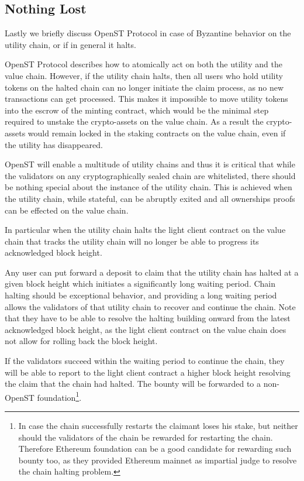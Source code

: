 \documentclass[12pt,a4paper, twocolumn]{article}
\begin{document}
\subsection{Nothing Lost}
Lastly we briefly discuss OpenST Protocol in case of Byzantine behavior on the utility chain, or if in general it halts. \par
OpenST Protocol describes how to atomically act on both the utility and the value chain.  However, if the utility chain halts, then all users who hold utility tokens on the halted chain can no longer initiate the claim process, as no new transactions can get processed.  This makes it impossible to move utility tokens into the escrow of the minting contract, which would be the minimal step required to unstake the crypto-assets on the value chain.  As a result the crypto-assets would remain locked in the staking contracts on the value chain, even if the utility has disappeared. \par 
OpenST will enable a multitude of utility chains and thus it is critical that while the validators on any cryptographically sealed chain are whitelisted, there should be nothing special about the instance of the utility chain.  This is achieved when the utility chain, while stateful, can be abruptly exited and all ownerships proofs can be effected on the value chain. \par In particular when the utility chain halts the light client contract on the value chain that tracks the utility chain will no longer be able to progress its acknowledged block height.\par
Any user can put forward a deposit to claim that the utility chain has halted at a given block height which initiates a significantly long waiting period.  Chain halting should be exceptional behavior, and providing a long waiting period allows the validators of that utility chain to recover and continue the chain.  Note that they have to be able to resolve the halting building onward from the latest acknowledged block height, as the light client contract on the value chain does not allow for rolling back the block height. \par
If the validators succeed within the waiting period to continue the chain, they will be able to report to the light client contract a higher block height resolving the claim that the chain had halted.  The bounty will be forwarded to a non-OpenST foundation\footnote{In case the chain successfully restarts the claimant loses his stake, but neither should the validators of the chain be rewarded for restarting the chain.  Therefore Ethereum foundation can be a good candidate for rewarding such bounty too, as they provided Ethereum mainnet as impartial judge to resolve the chain halting problem.}.\par
\end{document}
